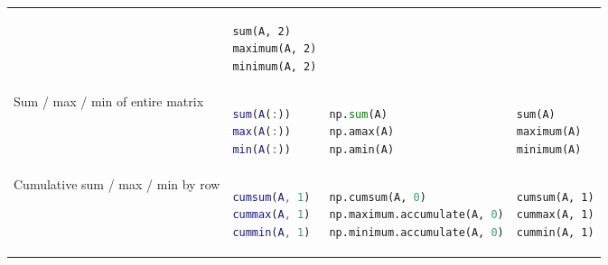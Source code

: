 \documentclass[10pt, landscape]{article}
\begin{document}
\begin{multicols}{2}
\begin{tabular}[]{@{}llll@{}}
\begin{minipage}[t]{0.24\columnwidth}
\end{minipage} & \begin{minipage}[t]{0.20\columnwidth}\raggedright
\begin{lstlisting}
sum(A, 2)
maximum(A, 2)
minimum(A, 2)
\end{lstlisting}

\end{minipage}\tabularnewline
\begin{minipage}[t]{0.23\columnwidth}\raggedright
Sum / max / min of entire matrix
\end{minipage} & \begin{minipage}[t]{0.22\columnwidth}\raggedright
\begin{lstlisting}[language=Matlab]
sum(A(:))
max(A(:))
min(A(:))
\end{lstlisting}

\end{minipage} & \begin{minipage}[t]{0.24\columnwidth}\raggedright
\begin{lstlisting}[language=Python]
np.sum(A)
np.amax(A)
np.amin(A)
\end{lstlisting}

\end{minipage} & \begin{minipage}[t]{0.20\columnwidth}\raggedright
\begin{lstlisting}
sum(A)
maximum(A)
minimum(A)
\end{lstlisting}

\end{minipage}\tabularnewline
\begin{minipage}[t]{0.23\columnwidth}\raggedright
Cumulative sum / max / min by row
\end{minipage} & \begin{minipage}[t]{0.22\columnwidth}\raggedright
\begin{lstlisting}[language=Matlab]
cumsum(A, 1)
cummax(A, 1)
cummin(A, 1)
\end{lstlisting}

\end{minipage} & \begin{minipage}[t]{0.24\columnwidth}\raggedright
\begin{lstlisting}[language=Python]
np.cumsum(A, 0)
np.maximum.accumulate(A, 0)
np.minimum.accumulate(A, 0)
\end{lstlisting}

\end{minipage} & \begin{minipage}[t]{0.20\columnwidth}\raggedright
\begin{lstlisting}
cumsum(A, 1)
cummax(A, 1)
cummin(A, 1)
\end{lstlisting}


\end{minipage}
\end{tabular}
\end{multicols}
\end{document}

